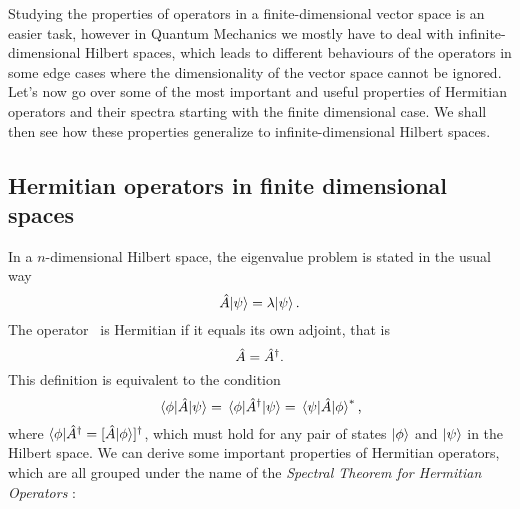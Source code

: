         Studying the properties of operators in a finite-dimensional vector space is an easier task, however in Quantum Mechanics we mostly have to deal with infinite-dimensional Hilbert spaces, which leads to different behaviours of the operators in some edge cases where the dimensionality of the vector space cannot be ignored. Let's now go over some of the most important and useful properties of Hermitian operators and their spectra \cite{Bernardini1993-iy} starting with the finite dimensional case. We shall then see how these properties generalize to infinite-dimensional Hilbert spaces.

        \subsection{Hermitian operators in finite dimensional spaces}
            In a $n$-dimensional Hilbert space, the eigenvalue problem is stated in the usual way
            \begin{equation*}
                \hat{A}\! \ket{\psi} = \lambda\! \ket{\psi}
                \text{.}
            \end{equation*}
            The operator \hA\ is Hermitian if it equals its own adjoint, that is
            \begin{equation*}
                \hat{A} = \hat{A}^\dagger
                \text{.}
            \end{equation*}
            This definition is equivalent to the condition
            \begin{equation}
                \label{eq:hermiticity-inner-product}
                \mel{\phi}{\ensuremath{\hat{A}}}{\psi}
                = \mel{\phi}{\ensuremath{\hat{A}}^\dag}{\psi}
                = \mel{\psi}{\ensuremath{\hat{A}}}{\phi}^*
                \text{,}
            \end{equation}
            where $\bra{\phi}\!\hA^\dag = \bqty*{\hA\!\ket{\phi}}\!^\dag$, which must hold for any pair of states $\ket{\phi}$ and $\ket{\psi}$ in the Hilbert space. We can derive some important properties of Hermitian operators, which are all grouped under the name of the \emph{Spectral Theorem for Hermitian Operators} \cite{Bernardini1993-iy}:

